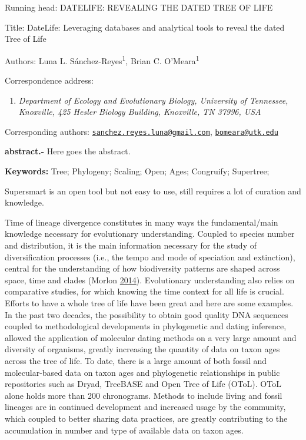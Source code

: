 \documentclass[]{article}
\title{}
\author{}
\date{}
\providecommand{\tightlist}{%
  \setlength{\itemsep}{0pt}\setlength{\parskip}{0pt}}
\begin{document}
Running head: DATELIFE: REVEALING THE DATED TREE OF LIFE

Title: DateLife: Leveraging databases and analytical tools to reveal the dated Tree of Life

Authors: Luna L. Sánchez-Reyes\textsuperscript{1}, Brian C. O'Meara\textsuperscript{1}

Correspondence address:

\begin{enumerate}
\def\labelenumi{\arabic{enumi}.}
\tightlist
\item
  \emph{Department of Ecology and Evolutionary Biology, University of Tennessee, Knoxville, 425 Hesler Biology Building, Knoxville, TN 37996, USA}
\end{enumerate}

Corresponding authors: \href{mailto:sanchez.reyes.luna@gmail.com}{\nolinkurl{sanchez.reyes.luna@gmail.com}}, \href{mailto:bomeara@utk.edu}{\nolinkurl{bomeara@utk.edu}}

\newpage

\textbf{abstract.-} Here goes the abstract.

\textbf{Keywords:} Tree; Phylogeny; Scaling; Open; Ages; Congruify; Supertree;

\newpage

Supersmart is an open tool but not easy to use, still requires a lot of curation and knowledge.

Time of lineage divergence
constitutes in many ways the fundamental/main knowledge necessary for evolutionary
understanding.
Coupled to species number and distribution, it is the main information necessary
for the study of diversification processes (i.e., the tempo and mode of speciation
and extinction),
central for the understanding of how biodiversity
patterns are shaped across space, time and clades (Morlon \protect\hyperlink{ref-Morlon2014}{2014}).
Evolutionary understanding also relies on comparative studies, for which knowing
the time context for all life is crucial. Efforts to have a whole tree of life have
been great and here are some examples.
In the past two decades, the possibility to obtain good quality DNA sequences
coupled to methodological developments in phylogenetic and dating inference, allowed
the application of molecular dating methods on a very large amount and diversity
of organisms, greatly increasing the quantity of data on taxon
ages across the tree of life.
To date, there is a large amount of both fossil and molecular-based data on taxon
ages and phylogenetic relationships in public repositories such as Dryad, TreeBASE
and Open Tree of Life (OToL).
OToL alone holds more than 200 chronograms.
Methods to include living and fossil lineages are in continued development and increased
usage by the community,
which coupled to better sharing data practices, are greatly contributing to the
accumulation in number and type of available data on taxon ages.
\end{document}
